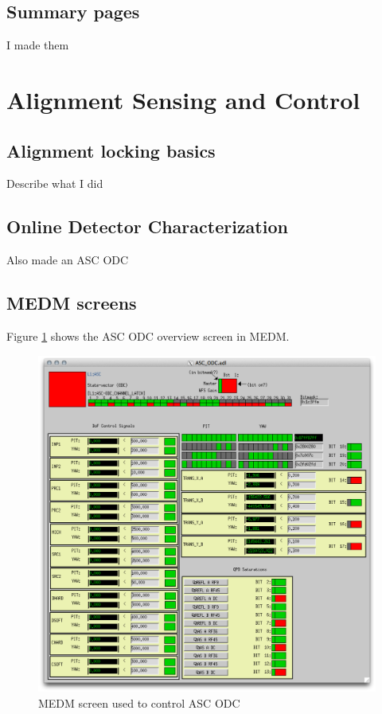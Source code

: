 \subsection{Summary pages}
I made them

\section{Alignment Sensing and Control}

\subsection{Alignment locking basics}

Describe what I did

\subsection{Online Detector Characterization}

Also made an ASC ODC

\subsection{MEDM screens}

Figure \ref{fig:asc-odc} shows the ASC ODC overview screen in MEDM.

\begin{figure}[ht!]
\includegraphics[width=\textwidth]{figures/ODC/ASC_screen}
\caption[ASC ODC Overview Screen]{MEDM screen used to control ASC ODC}
\label{fig:asc-odc}
\end{figure}

